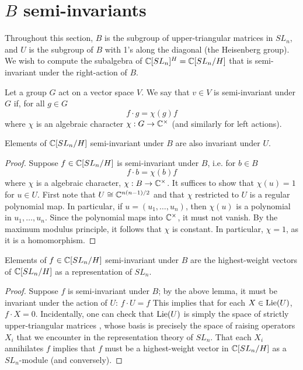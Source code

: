 \documentclass{../mathnotes}
\begin{document}
\section{$B$ semi-invariants}

Throughout this section, $B$ is the subgroup of upper-triangular matrices in $SL_n$, and $U$ is the subgroup of $B$ with
1's along the diagonal (the Heisenberg group). We wish to compute the subalgebra of $\mathbb{C}[SL_n]^H=\mathbb{C}[SL_n/H]$ that is semi-invariant
under the right-action of $B$. 

\begin{defn}
    Let a group $G$ act on a vector space $V$. We say that $v\in V$ is semi-invariant under $G$ if, for all $g\in G$
    \[f\cdot g=\chi(g) f\]
    where $\chi$ is an algebraic character $\chi:G\to\mathbb{C}^\times$ (and similarly for left actions).
\end{defn}

\begin{lem}
    Elements of $\mathbb{C}[SL_n/H]$ semi-invariant under $B$ are also invariant under $U$.
\end{lem}

\begin{proof}
    Suppose $f\in\mathbb{C}[SL_n/H]$ is semi-invariant under $B$, i.e. for $b\in B$
    \[f\cdot b=\chi(b) f\]
    where $\chi$ is a algebraic character, $\chi:B\to\mathbb{C}^\times$. It suffices to show that $\chi(u)=1$ for $u\in U$.
    First note that $U\cong\mathbb{C}^{n(n-1)/2}$ and that $\chi$ restricted to $U$ is a regular polynomial map. In particular,
    if $u=(u_1,\ldots, u_n)$, then $\chi(u)$ is a polynomial in $u_1,\ldots, u_n$. Since the polynomial maps into $\mathbb{C}^\times$,
    it must not vanish. By the maximum modulus principle, it follows that $\chi$ is constant. In particular, $\chi=1$, as it
    is a homomorphism.
\end{proof}

\begin{thm}
    Elements of $f\in\mathbb{C}[SL_n/H]$ semi-invariant under $B$ are the highest-weight vectors of $\mathbb{C}[SL_n/H]$ as a representation of $SL_n$.
\end{thm}

\begin{proof}
    Suppose $f$ is semi-invariant under $B$; by the above lemma, it must be invariant under the action of $U$: $f\cdot U=f$ This implies that
    for each $X\in \operatorname{Lie}(U)$, $f\cdot X=0$. Incidentally, one can check that $\operatorname{Lie}(U)$ is simply the space of strictly upper-triangular matrices
    \cite{hall2003lie}, whose basis is precisely the space of raising operators $X_i$ that we encounter in the representation theory of $SL_n$.
    That each $X_i$ annihilates $f$ implies that $f$ must be a highest-weight vector in $\mathbb{C}[SL_n/H]$ as a $SL_n$-module (and conversely).
\end{proof}
\end{document}
